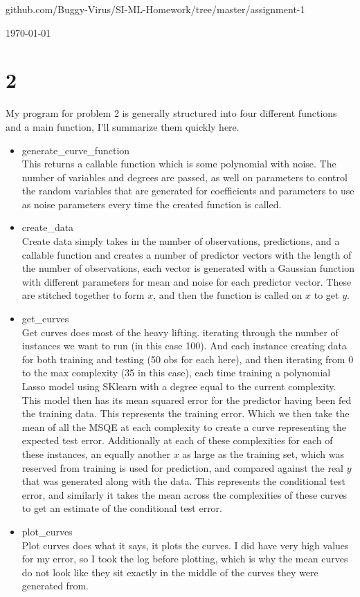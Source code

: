 \documentclass[11pt]{article} %
\newcommand{\problem}[1]{\section{#1}}		%
\begin{document}
\centerline{\LARGE}
\centerline{\LARGE\thishw}
\vspace{2mm} \newline
\centerline{\small github.com/Buggy-Virus/SI-ML-Homework/tree/master/assignment-1}
\centerline{\small\today}

\problem{2}
My program for problem 2 is generally structured into four different functions and a main function, I'll summarize them quickly here.
\begin{itemize}
    \item generate\_curve\_function \\
    This returns a callable function which is some polynomial with noise. The number of variables and degrees are passed, as well on parameters to control the random variables that are generated for coefficients and parameters to use as noise parameters every time the created function is called.
    \item create\_data \\
    Create data simply takes in the number of observations, predictions, and a callable function and creates a number of predictor vectors with the length of the number of observations, each vector is generated with a Gaussian function with different parameters for mean and noise for each predictor vector. These are stitched together to form $x$, and then the function is called on $x$ to get $y$.
    \item get\_curves \\
    Get curves does most of the heavy lifting. iterating through the number of instances we want to run (in this case 100). And each instance creating data for both training and testing (50 obs for each here), and then iterating from 0 to the max complexity (35 in this case), each time training a polynomial Lasso model using SKlearn with a degree equal to the current complexity. \newline
    This model then has its mean squared error for the predictor having been fed the training data. This represents the training error. Which we then take the mean of all the MSQE at each complexity to create a curve representing the expected test error. \newline
    Additionally at each of these complexities for each of these instances, an equally another $x$ as large as the training set, which was reserved from training is used for prediction, and compared against the real $y$ that was generated along with the data. This represents the conditional test error, and similarly it takes the mean across the complexities of these curves to get an estimate of the conditional test error.
    \item plot\_curves \\
    Plot curves does what it says, it plots the curves. I did have very high values for my error, so I took the log before plotting, which is why the mean curves do not look like they sit exactly in the middle of the curves they were generated from.
    \newpage


\end{itemize}
\end{document}
